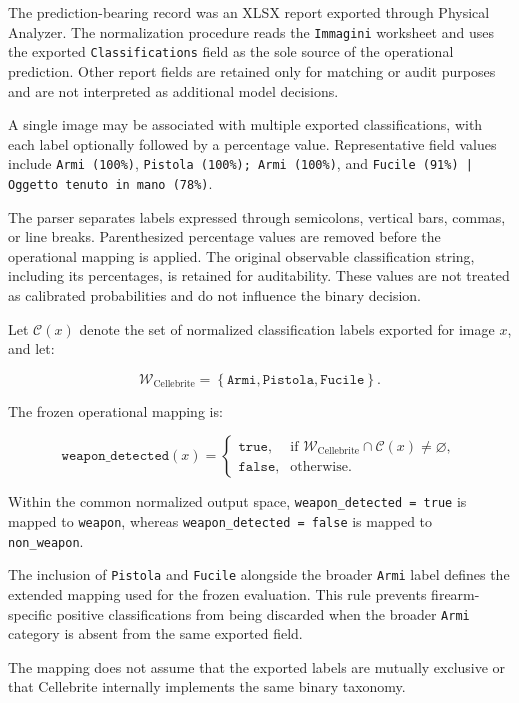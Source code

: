 The prediction-bearing record was an XLSX report exported through Physical
Analyzer. The normalization procedure reads the \texttt{Immagini} worksheet
and uses the exported \texttt{Classifications} field as the sole source of the
operational prediction. Other report fields are retained only for matching or
audit purposes and are not interpreted as additional model decisions.

A single image may be associated with multiple exported classifications, with
each label optionally followed by a percentage value. Representative field
values include \texttt{Armi (100\%)},
\texttt{Pistola (100\%); Armi (100\%)}, and
\texttt{Fucile (91\%) | Oggetto tenuto in mano (78\%)}.

The parser separates labels expressed through semicolons, vertical bars,
commas, or line breaks. Parenthesized percentage values are removed before the
operational mapping is applied. The original observable classification string,
including its percentages, is retained for auditability. These values are not
treated as calibrated probabilities and do not influence the binary decision.

Let \(\mathcal{C}(x)\) denote the set of normalized classification labels
exported for image \(x\), and let:

\[
\mathcal{W}_{\mathrm{Cellebrite}}
=
\left\{
\texttt{Armi},
\texttt{Pistola},
\texttt{Fucile}
\right\}.
\]

The frozen operational mapping is:

\[
\texttt{weapon\_detected}(x)
=
\begin{cases}
\texttt{true},
&
\text{if }
\mathcal{W}_{\mathrm{Cellebrite}}
\cap
\mathcal{C}(x)
\neq
\varnothing,
\\
\texttt{false},
&
\text{otherwise}.
\end{cases}
\]

Within the common normalized output space,
\texttt{weapon\_detected = true} is mapped to \texttt{weapon}, whereas
\texttt{weapon\_detected = false} is mapped to
\texttt{non\_weapon}.

The inclusion of \texttt{Pistola} and \texttt{Fucile} alongside the broader
\texttt{Armi} label defines the extended mapping used for the frozen
evaluation. This rule prevents firearm-specific positive classifications from
being discarded when the broader \texttt{Armi} category is absent from the
same exported field.

The mapping does not assume that the exported labels are mutually exclusive or
that Cellebrite internally implements the same binary taxonomy.

